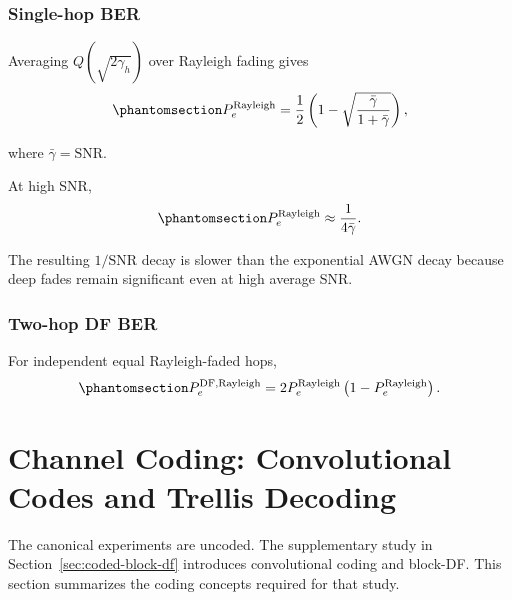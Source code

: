 \subsubsection{Single-hop BER}\label{sec:rayleigh-single-hop-ber}

Averaging \(Q(\sqrt{2\gamma_h})\) over Rayleigh fading gives \cite[Eq.~14-4-15]{ProakisSalehi2008DigitalComm}
\begin{equation}\protect\phantomsection\label{eq:rayleigh-ber}
P_e^{\text{Rayleigh}}
=
\frac{1}{2}
\left(
1-\sqrt{\frac{\bar{\gamma}}{1+\bar{\gamma}}}
\right),
\end{equation}
where \(\bar{\gamma}=\text{SNR}\).

At high SNR,
\begin{equation}\protect\phantomsection\label{eq:rayleigh-ber-approx}
P_e^{\text{Rayleigh}}
\approx
\frac{1}{4\bar{\gamma}}.
\end{equation}

The resulting \(1/\text{SNR}\) decay is slower than the exponential AWGN decay because deep fades remain significant even at high average SNR.

\subsubsection{Two-hop DF BER}\label{sec:rayleigh-two-hop-df-ber}

For independent equal Rayleigh-faded hops,
\begin{equation}\protect\phantomsection\label{eq:df-ber-rayleigh}
P_e^{\text{DF,Rayleigh}}
=
2P_e^{\text{Rayleigh}}
\left(
1-P_e^{\text{Rayleigh}}
\right).
\end{equation}

\section{Channel Coding: Convolutional Codes and Trellis Decoding}\label{sec:channel-coding-convolutional-codes}

The canonical experiments are uncoded. The supplementary study in Section~\ref{sec:coded-block-df} introduces convolutional coding and block-DF. This section summarizes the coding concepts required for that study.

